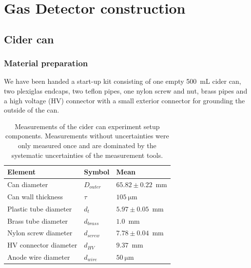 \section{Gas Detector construction}
\label{sec:construction}

\subsection{Cider can}
\subsubsection{Material preparation}
We have been handed a start-up kit consisting of one empty \SI{500}{\milli\liter}
cider can, two plexiglas endcaps, two teflon pipes, one nylon screw and nut,
brass pipes and a high voltage (HV) connector with a small exterior connector for
grounding the outside of the can.

\begin{table}[H]
  \begin{tabularx}{\linewidth}{p{3.6cm}p{1cm}p{3cm}}
    \textbf{Element}           & \textbf{Symbol}              & \textbf{Mean} \\ \hline
    Can diameter         & $D_{outer}$   & $65.82 \pm 0.22$~mm     \\
    Can wall thickness   & $\tau$        & $\SI{105}{\micro\meter}$   \\
    Plastic tube diameter      & $d_{t}$       & $5.97 \pm 0.05$~mm       \\
    Brass tube diameter        & $d_{brass}$   & $1.0$~mm       \\
    Nylon screw diameter       & $d_{screw}$   & $7.78 \pm 0.04$~mm       \\
    HV connector diameter      & $d_{HV}$      & $9.37$~mm      \\
    Anode wire diameter        & $d_{wire}$    & $\SI{50}{\micro\meter}$    \\
    \hline
  \end{tabularx}
  \caption{Measurements of the cider can experiment setup components. Measurements without uncertainties were only measured once and are dominated by the systematic uncertainties of the measurement tools.}
  \label{Tab:cidercan_sizes}
\end{table}


